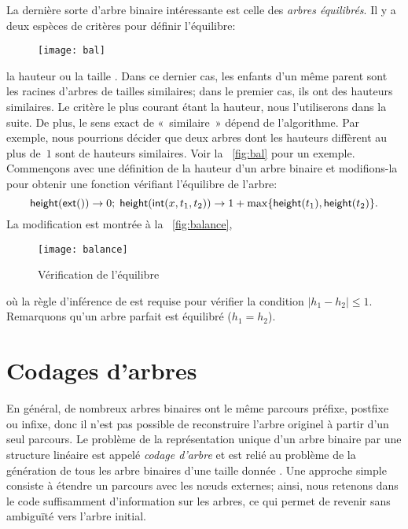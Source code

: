 La dernière sorte d'arbre binaire intéressante est celle des
\emph{arbres équilibrés}. Il y a
deux espèces de critères pour définir l'équilibre:
\begin{wrapfigure}[7]{r}[0pt]{0pt}
\centering
\texttt{[image: bal]}
\caption{\label{fig:bal}}
\end{wrapfigure}
la hauteur ou la taille
\citep{NievergeltReingold_1972,HiraiYamamoto_2011}. Dans ce dernier
cas, les enfants d'un même parent sont les racines d'arbres de tailles
similaires; dans le premier cas, ils ont des hauteurs similaires. Le
critère le plus courant étant la hauteur, nous l'utiliserons dans la
suite. De plus, le sens exact de «~similaire~» dépend de
l'algorithme. Par exemple, nous pourrions décider que deux arbres dont
les hauteurs diffèrent au plus de~\(1\) sont de hauteurs
similaires. Voir la \fig~\vref{fig:bal} pour un exemple. Commençons
avec une définition de la hauteur d'un arbre binaire et
modifions-la pour obtenir une fonction vérifiant l'équilibre de
l'arbre:
\begin{equation*}
\textsf{height}(\textsf{ext}()) \rightarrow 0;
\;
\textsf{height}(\textsf{int}(x,t_1,t_2)) \rightarrow 1 +
\max\{\textsf{height}(t_1), \textsf{height}(t_2)\}.
\end{equation*}
La modification est montrée à la \fig~\vref{fig:balance},
\begin{figure}
\centering
\texttt{[image: balance]}
\caption{Vérification de l'équilibre\label{fig:balance}}
\end{figure}
où la règle d'inférence de
 est requise pour
vérifier la condition \(|h_1 - h_2| \leqslant 1\). Remarquons qu'un
arbre parfait est équilibré (\(h_1 = h_2\)).

\section{Codages d'arbres}

En général, de nombreux arbres binaires ont le même parcours préfixe,
postfixe ou infixe, donc il n'est pas possible de reconstruire l'arbre
originel à partir d'un seul parcours. Le problème de la représentation
unique d'un arbre binaire par une structure linéaire est appelé
\emph{codage d'arbre} \citep{Makinen_1991} et est relié au problème de
la génération de tous les arbre binaires d'une taille donnée
\citep[7.2.1.6]{Knuth_2011}. Une approche simple consiste à étendre un
parcours avec les n{\oe}uds externes; ainsi, nous retenons dans le
code suffisamment d'information sur les arbres, ce qui permet de
revenir sans ambiguïté vers l'arbre initial.

